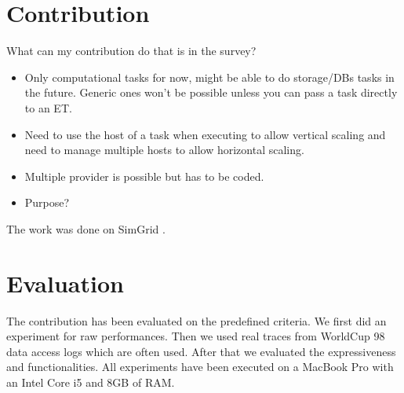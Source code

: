 \documentclass[a4paper]{IEEEtran}
\begin{document}
\section{Contribution} \label{contrib}
  What can my contribution do that is in the survey?
  \begin{itemize}
    \item Only computational tasks for now, might be able to do storage/DBs
    tasks in the future. Generic ones won't be possible unless you can pass a
    task directly to an ET.
    \item Need to use the host of a task when executing to allow vertical
    scaling and need to manage multiple hosts to allow horizontal scaling.
    \item Multiple provider is possible but has to be coded.
    \item Purpose?
  \end{itemize}
  
  The work was done on SimGrid \cite{casanova:hal-01017319}.


\section{Evaluation} \label{eval}
  The contribution has been evaluated on the predefined criteria. We first did 
  an experiment for raw performances. Then we used real traces from WorldCup 98 
  data access logs \cite{wc98} which are often used. After that we evaluated 
  the expressiveness and functionalities. All experiments have been executed on 
  a MacBook Pro with an Intel Core i5 and 8GB of RAM.
    
\end{document}
